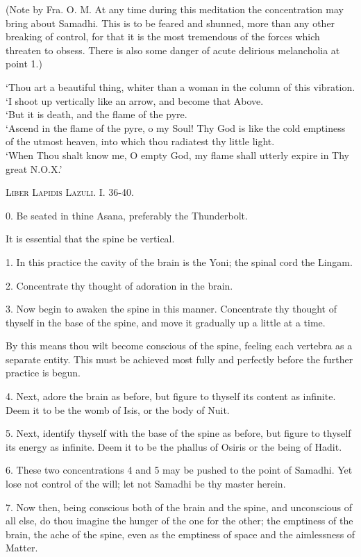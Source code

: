 (Note by Fra. O. M. At any time during this meditation the concentration may bring about Samadhi. This is to be feared and shunned, more than any other breaking of control, for that it is the most tremendous of the forces which threaten to obsess. There is also some danger of acute delirious melancholia at point 1.)


\pagebreak


\epigraph{
`Thou art a beautiful thing, whiter than a woman in the column of this vibration. \\
`I shoot up vertically like an arrow, and become that Above. \\
`But it is death, and the flame of the pyre. \\
`Ascend in the flame of the pyre, o my Soul! Thy God is like the cold emptiness of the utmost heaven, into which thou radiatest thy little light. \\
`When Thou shalt know me, O empty God, my flame shall utterly expire in Thy great N.O.X.' }{\textsc{Liber Lapidis Lazuli. I. 36-40.}}


0. Be seated in thine Asana, preferably the Thunderbolt.

It is essential that the spine be vertical.

1. In this practice the cavity of the brain is the Yoni; the spinal cord the Lingam.

2. Concentrate thy thought of adoration in the brain.

3. Now begin to awaken the spine in this manner. Concentrate thy thought of thyself in the base of the spine, and move it gradually up a little at a time.

By this means thou wilt become conscious of the spine, feeling each vertebra as a separate entity. This must be achieved most fully and perfectly before the further practice is begun.

4. Next, adore the brain as before, but figure to thyself its content as infinite. Deem it to be the womb of Isis, or the body of Nuit.

5. Next, identify thyself with the base of the spine as before, but figure to thyself its energy as infinite. Deem it to be the phallus of Osiris or the being of Hadit.

6. These two concentrations 4 and 5 may be pushed to the point of Samadhi. Yet lose not control of the will; let not Samadhi be thy master herein.

7. Now then, being conscious both of the brain and the spine, and unconscious of all else, do thou imagine the hunger of the one for the other; the emptiness of the brain, the ache of the spine, even as the emptiness of space and the aimlessness of Matter.

